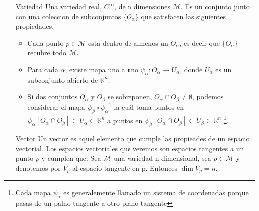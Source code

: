 \documentclass[../Main.tex]{subfiles}
\begin{document}
\begin{itemize}
    \item [Variedad]
    Una variedad real, $C^{\infty}$, de n dimensiones $\mathcal{M}$. Es un conjunto junto con una coleccion de subconjuntos $\{O_{\alpha}\}$ que satisfacen las siguientes propiedades.
    \begin{itemize}
        \item Cada punto $p \in \mathcal{M}$ esta dentro de almenos un $O_{\alpha}$, es decir que $\{O_{\alpha}\}$ recubre todo $\mathcal{M}$.
        \item Para cada $\alpha$, existe mapa uno a uno $\psi_{\alpha}:O_{\alpha}\rightarrow U_{\alpha}$, donde $U_{\alpha}$ es un subconjunto abierto de $\mathbb{R}^{n}$.
        \item Si dos conjuntos $O_{\alpha}$ y $O_{\beta}$  se sobreponen, $O_{\alpha} \cap O_{\beta} \neq \emptyset$, podemos considerar el mapa $\psi_{\beta} \circ \psi_{\alpha}^{-1}$ la cuál toma puntos en $\psi_{\alpha}[O_{\alpha} \cap O_{\beta}]\subset U_{\alpha}\subset \mathbb{R}^{n}$ a puntos en $\psi_{\beta}[O_{\alpha} \cap O_{\beta}]\subset U_{\beta}\subset \mathbb{R}^{n}$ \footnote{Cada mapa $\psi_{\alpha}$ es generalemente llamado un sistema de coordenadas porque pasas de un palno tangente a otro plano tangente}.
    \end{itemize}

    \item [Vector]
    Un vector es aquel elemento que cumple las propieades de un espacio vectorial. Los espacios vectoriales que veremos son espacios tangentes a un punto $p$ y cumplen que: Sea $\mathcal{M}$ una variedad n-dimensional, sea $p \in \mathcal{M}$ y denotemos por $V_{p}$ al espacio tangente en p. Entonces $\dim{V_{p}} = n$.


\end{itemize}
\end{document}
